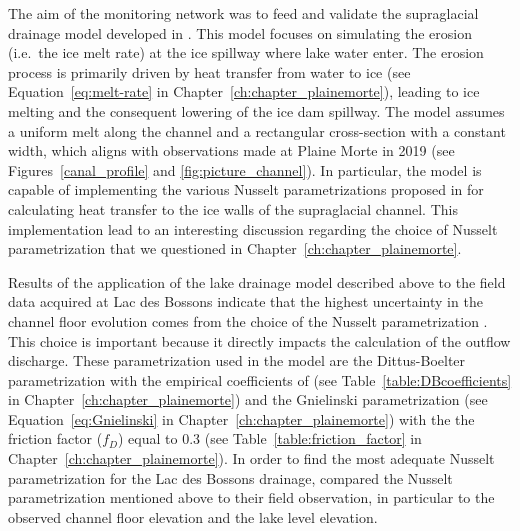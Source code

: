 The aim of the monitoring network was to feed and validate the supraglacial drainage model developed in \cite{Vincent&al2010}. This model focuses on simulating the erosion (i.e.\ the ice melt rate) at the ice spillway where lake water enter. The erosion process is primarily driven by heat transfer from water to ice (see Equation~\ref{eq:melt-rate} in Chapter~\ref{ch:chapter_plainemorte}), leading to ice melting and the consequent lowering of the ice dam spillway. The model assumes a uniform melt along the channel and a rectangular cross-section with a constant width, which aligns with observations made at Plaine Morte in 2019 (see Figures~\ref{canal_profile} and \ref{fig:picture_channel}). In particular, the model is capable of implementing the various Nusselt parametrizations proposed in \cite{Clarke2003, Vincent&al2010, Ogier&al2021} for calculating heat transfer to the ice walls of the supraglacial channel. This implementation lead to an interesting discussion regarding the choice of Nusselt parametrization that we questioned in Chapter~\ref{ch:chapter_plainemorte}.



Results of the application of the lake drainage model described above to the field data acquired at Lac des Bossons indicate that the highest uncertainty in the channel floor evolution comes from the choice of the Nusselt parametrization \cite{Gagliardini&al2024}. This choice is important because it directly impacts the calculation of the outflow discharge. These parametrization used in the model are the Dittus-Boelter parametrization with the empirical coefficients of \cite{Clarke2003,Vincent&al2010,Ogier&al2021} (see Table~\ref{table:DBcoefficients} in Chapter~\ref{ch:chapter_plainemorte}) and the Gnielinski parametrization (see Equation~\ref{eq:Gnielinski} in Chapter~\ref{ch:chapter_plainemorte}) with the the friction factor ($f_D$) equal to 0.3 (see Table~\ref{table:friction_factor} in Chapter~\ref{ch:chapter_plainemorte}). In order to find the most adequate Nusselt parametrization for the Lac des Bossons drainage, \cite{Gagliardini&al2024} compared the Nusselt parametrization mentioned above to their field observation, in particular to the observed channel floor elevation and the lake level elevation. 

